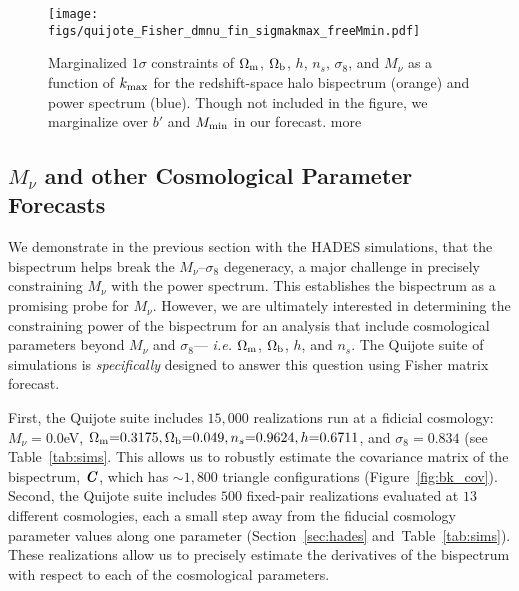 \documentclass[12pt, letterpaper, preprint]{aastex62}
\newcommand{\Om}{\Omega_{\rm m}}
\newcommand{\Ob}{\Omega_{\rm b}}
\newcommand{\smnu}{M_\nu}
\newcommand{\sig}{\sigma_8}
\newcommand{\bfi}[1]{\textbf{\textit{#1}}}
\newcommand{\ch}[1]{{\color{orange}{\bf CH:} #1}}
\begin{document}
\begin{figure}
\begin{center}
    \texttt{[image: figs/quijote\_Fisher\_dmnu\_fin\_sigmakmax\_freeMmin.pdf]} 
    \caption{Marginalized $1\sigma$ constraints of $\Om$, $\Ob$, $h$, $n_s$, $\sig$, and $\smnu$ 
    as a function of $k_{\rm max}$ for the redshift-space halo bispectrum (orange) and power 
    spectrum (blue). Though not included in the figure, we marginalize over $b'$ and $M_{\rm min}$
    in our forecast.\ch{more}}
\label{fig:fish_kmax}
\end{center}
\end{figure}

\subsection{$\smnu$ and other Cosmological Parameter Forecasts} \label{sec:forecasts}
We demonstrate in the previous section with the HADES simulations, that 
the bispectrum helps break the $\smnu$--$\sig$ degeneracy, a major 
challenge in precisely constraining $\smnu$ with the power spectrum. 
This establishes the bispectrum as a promising probe for $\smnu$. However, 
we are ultimately interested in determining the constraining power of the 
bispectrum for an analysis that include cosmological parameters beyond 
$\smnu$ and $\sig$--- \emph{i.e.} $\Om$, $\Ob$, $h$, and $n_s$. The Quijote 
suite of simulations is \emph{specifically} designed to answer this question
using Fisher matrix forecast.

First, the Quijote suite includes $15,000$ realizations run at a fidicial 
cosmology: $\smnu{=}0.0$eV, $\Om{=}0.3175, \Ob{=}0.049, n_s{=}0.9624, h{=}0.6711$, 
and $\sig=0.834$ (see Table~\ref{tab:sims}. This allows us to robustly estimate 
the covariance matrix of the bispectrum, $\bfi{C}$, which has ${\sim}1,800$ 
triangle configurations (Figure~\ref{fig:bk_cov}). Second, the Quijote suite 
includes $500$ fixed-pair realizations evaluated at $13$ different cosmologies,
each a small step away from the fiducial cosmology parameter values along one 
parameter (Section~\ref{sec:hades} and~Table~\ref{tab:sims}). These realizations 
allow us to precisely estimate the derivatives of the bispectrum with respect 
to each of the cosmological parameters.
\end{document}
